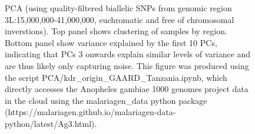 \documentclass[a4paper,12pt]{article}
\begin{document}
\clearpage


\begin{figure}[h]
	\begin{center}
		\vskip 0.4cm
	\caption{\footnotesize PCA (using quality-filtered biallelic SNPs from genomic region 3L:15,000,000-41,000,000, euchromatic and free of chromosomal inverstions). Top panel shows clustering of samples by region. Bottom panel show variance explained by the first 10 PCs, indicating that PCs 3 onwards explain similar levels of variance and are thus likely only capturing noise. This figure was produced using the script PCA/kdr\_origin\_GAARD\_Tanzania.ipynb, which directly accesses the Anopheles gambiae 1000 genomes project data in the cloud using the malariagen\_data python package (https://malariagen.github.io/malariagen-data-python/latest/Ag3.html).}
	\end{center}
	\label{FigS3}
\end{figure}


\clearpage
\end{document}

